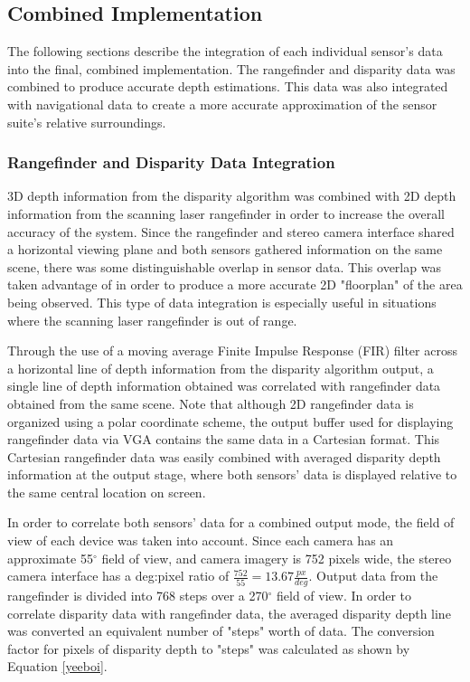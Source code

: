 \subsection{Combined Implementation}
The following sections describe the integration of each individual sensor's data into the final, combined implementation. The rangefinder and disparity data was combined to produce accurate depth estimations. This data was also integrated with navigational data to create a more accurate approximation of the sensor suite's relative surroundings. 

\subsubsection{Rangefinder and Disparity Data Integration}
3D depth information from the disparity algorithm was combined with 2D depth information from the scanning laser rangefinder in order to increase the overall accuracy of the system. Since the rangefinder and stereo camera interface shared a horizontal viewing plane and both sensors gathered information on the same scene, there was some distinguishable overlap in sensor data. This overlap was taken advantage of in order to produce a more accurate 2D "floorplan" of the area being observed. This type of data integration is especially useful in situations where the scanning laser rangefinder is out of range.
\par
Through the use of a moving average Finite Impulse Response (FIR) filter across a horizontal line of depth information from the disparity algorithm output, a single line of depth information obtained was correlated with rangefinder data obtained from the same scene. Note that although 2D rangefinder data is organized using a polar coordinate scheme, the output buffer used for displaying rangefinder data via VGA contains the same data in a Cartesian format. This Cartesian rangefinder data was easily combined with averaged disparity depth information at the output stage, where both sensors' data is displayed relative to the same central location on screen.
\par
In order to correlate both sensors' data for a combined output mode, the field of view of each device was taken into account. Since each camera has an approximate 55$^\circ$ field of view, and camera imagery is 752 pixels wide, the stereo camera interface has a deg:pixel ratio of $\frac{752}{55}=13.67\frac{px}{deg}$. Output data from the rangefinder is divided into 768 steps over a 270$^\circ$ field of view. In order to correlate disparity data with rangefinder data, the averaged disparity depth line was converted an equivalent number of "steps" worth of data. The conversion factor for pixels of disparity depth to "steps" was calculated as shown by Equation \ref{yeeboi}.
